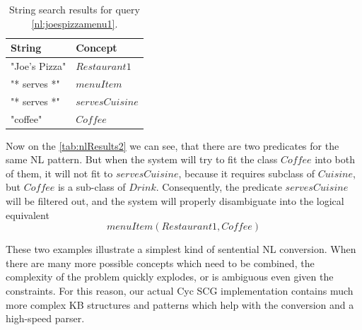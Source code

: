 \begin{table}[H]
\centering
\caption{String search results for query \ref{nl:joespizzamenu1}.}
\label{tab:nlResults2}
\begin{tabular}{|l|l|}
	\hline
	\textbf{String} & \textbf{Concept} \\
    \hline
    "Joe's Pizza" & $Restaurant1$ \\
    \hline
    "* serves *" & $menuItem$ \\
    \hline
	"* serves *" & $servesCuisine$\\
	\hline
    "coffee" & $Coffee$ \\
    \hline
\end{tabular}
\end{table}
Now on the \autoref{tab:nlResults2} we can see, that there are two predicates
for the same NL pattern. But when the system will try to fit the class $Coffee$
into both of them, it will not fit to $servesCuisine$, because it requires
subclass of $Cuisine$, but $Coffee$ is a sub-class of $Drink$. Consequently,
the predicate $servesCuisine$ will be filtered out, and the system will
properly disambiguate into the logical equivalent
\begin{equation*}
	menuItem(Restaurant1,Coffee)
\end{equation*}

These two examples illustrate a simplest kind of sentential NL conversion. 
When there are many more possible concepts which need to be combined, the 
complexity of the problem quickly explodes, or is ambiguous even given the 
constraints. For this reason, our actual Cyc SCG implementation contains much 
more complex KB structures and patterns which help with the conversion and a 
high-speed parser.

